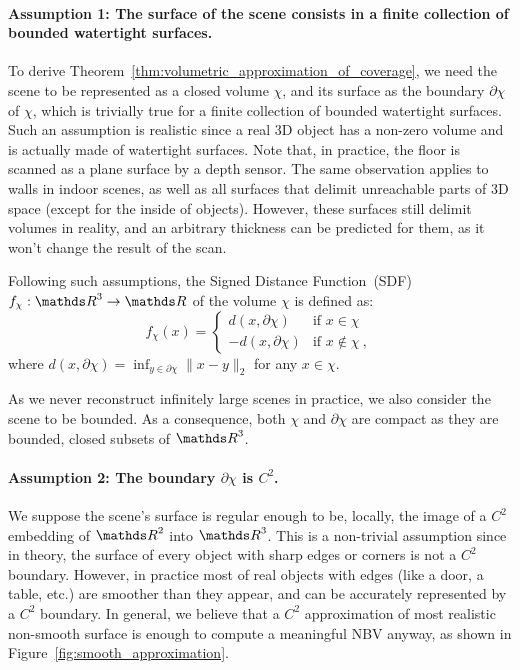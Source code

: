 \paragraph{Assumption 1: The surface of the scene consists in a finite collection of bounded watertight surfaces.} 
To derive Theorem~\ref{thm:volumetric_approximation_of_coverage}, we need the scene to be represented as a closed volume $\chi$, and its surface as the boundary $\partial\chi$ of $\chi$, which is trivially true for a finite collection of bounded watertight surfaces. Such an assumption is realistic since a real 3D object has a non-zero volume and is actually made of watertight surfaces. Note that, in practice, the floor is scanned as a plane surface by a depth sensor. The same observation applies to walls in indoor scenes, as well as all surfaces that delimit unreachable parts of 3D space (except for the inside of objects). However, these surfaces still delimit volumes in reality, and an arbitrary thickness can be predicted for them, as it won't change the result of the scan.

Following such assumptions, the Signed Distance Function~(SDF) $f_\chi:\IR^3 \rightarrow \IR$ of the volume $\chi$ is defined as:
%
\begin{equation}
    \label{sdf}
    f_\chi(x) =
    \begin{cases}
            d(x, \partial\chi) & \text{if } x\in \chi\\
            -d(x, \partial\chi) & \text{if } x \notin \chi\> ,
        \end{cases}
\end{equation}
where $d(x, \partial\chi) = \inf_{y\in\partial\chi}\|x-y\|_2$ for any $x\in \chi$.

As we never reconstruct infinitely large scenes in practice, we also consider the scene to be bounded. As a consequence, both $\chi$ and $\partial\chi$ are compact as they are bounded, closed subsets of $\IR^3$.

\paragraph{Assumption 2: The boundary $\partial \chi$ is $C^2$.}

We suppose the scene's surface is regular enough to be, locally, the image of a $C^2$ embedding of $\IR^2$ into $\IR^3$. This is a non-trivial assumption since in theory, the surface of every object with sharp edges or corners is not a $C^2$ boundary. However, in practice most of real objects with edges (like a door, a table, etc.) are smoother than they appear, and can be accurately represented by a $C^2$ boundary. In general, we believe that a $C^2$ approximation of most realistic non-smooth surface is enough to compute a meaningful NBV anyway, as shown in Figure~\ref{fig:smooth_approximation}.

